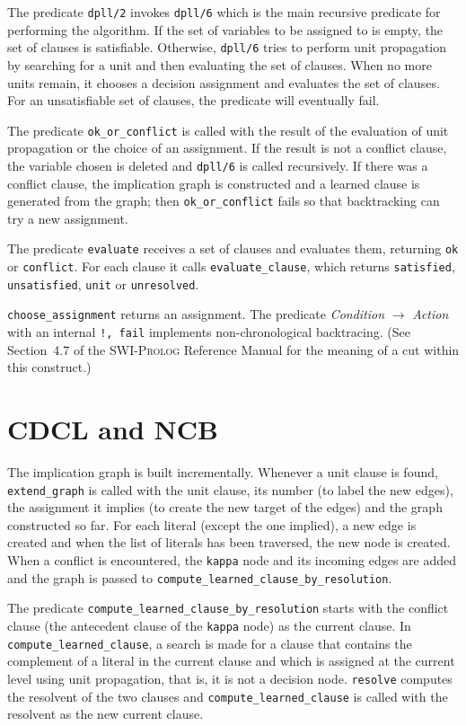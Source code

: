 \documentclass[11pt]{report}
\newcommand*{\p}[1]{\textup{\texttt{#1}}}
\newcommand*{\sw}{\textsc{SWI-Prolog}}
\begin{document}
The predicate \p{dpll/2} invokes \p{dpll/6} which is the main recursive
predicate for performing the algorithm. If the set of variables to be
assigned to is empty, the set of clauses is satisfiable. Otherwise,
\p{dpll/6} tries to perform unit propagation by searching for a unit and
then evaluating the set of clauses. When no more units remain, it
chooses a decision assignment and evaluates the set of clauses.
For an unsatisfiable set of clauses, the predicate will eventually fail.

The predicate \p{ok\_or\_conflict} is called with the result of the
evaluation of unit propagation or the choice of an assignment. If the
result is not a conflict clause, the variable chosen is deleted and
\p{dpll/6} is called recursively. If there was a conflict clause, the
implication graph is constructed and a learned clause is generated from
the graph; then \p{ok\_or\_conflict} fails so that backtracking can try
a new assignment.

The predicate \p{evaluate} receives a set of clauses and evaluates them,
returning \p{ok} or \p{conflict}. For each clause it calls
\p{evaluate\_clause}, which returns \p{satisfied}, \p{unsatisfied},
\p{unit} or \p{unresolved}.

\p{choose\_assignment} returns an assignment. The predicate
\emph{Condition} $\rightarrow$ \emph{Action} with an internal \p{!,
fail} implements non-chronological backtracing. (See Section~4.7 of the
\sw{} Reference Manual for the meaning of a cut within this construct.)


\section{CDCL and NCB}

The implication graph is built incrementally. Whenever a unit clause is
found, \p{extend\_graph} is called with the unit clause, its number (to
label the new edges), the assignment it implies (to create the new
target of the edges) and the graph constructed so far. For each literal
(except the one implied), a new edge is created and when the list of
literals has been traversed, the new node is created. When a conflict is
encountered, the \p{kappa} node and its incoming edges are added and the
graph is passed to \p{compute\_learned\_clause\_by\_resolution}.

The predicate \p{compute\_learned\_clause\_by\_resolution} starts with
the conflict clause (the antecedent clause of the \p{kappa} node) as the
current clause. In \p{compute\_learned\_clause}, a search is made for a
clause that contains the complement of a literal in the current clause
and which is assigned at the current level using unit propagation, that
is, it is not a decision node. \p{resolve} computes the resolvent of the
two clauses and \p{compute\_learned\_clause} is called with the
resolvent as the new current clause.
\end{document}
